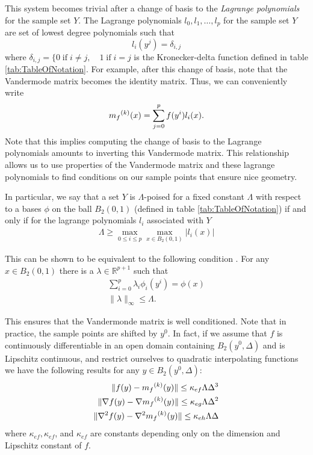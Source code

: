 This system becomes trivial after a change of basis to the \emph{Lagrange polynomials} for the sample set $Y$.
The Lagrange polynomials $l_0, l_1, \ldots, l_p$ for the sample set $Y$ are set of lowest degree polynomials such that
\[
l_i(y^j) = \delta_{i,j}
\]
where $\delta_{i,j} = \{0 \;\text{if}\; i\ne j,\quad 1 \;\text{if} \; i = j $ is the Kronecker-delta function defined in table \ref{tab:TableOfNotation}.
For example, after this change of basis, note that the Vandermode matrix becomes the identity matrix.
Thus, we can conveniently write
\[
\label{reg}
{{m}_f}^{(k)}(x) = \sum^p_{j=0}f(y^i)l_i(x).
\]
Note that this implies computing the change of basis to the Lagrange polynomials amounts to inverting this Vandermode matrix.
This relationship allows us to use properties of the Vandermode matrix and these lagrange polynomials to find conditions on our sample points that ensure nice geometry.

In particular, we say that a set $Y$ is $\Lambda$-poised for a fixed constant $\Lambda$ with respect to a bases $\phi$ on the ball 
$B_2(0, 1)$ (defined in table \ref{tab:TableOfNotation}) if and only if for the lagrange polynomials $l_i$ associated with $Y$
\begin{align}
\Lambda \ge \max_{0\le i\le p}\max_{x\in B_2(0, 1)}|l_i(x)|
\end{align}

This can be shown to be equivalent to the following condition \cite{DUMMY:intro_book}.
For any $x \in B_2(0, 1)$ there is a $\lambda \in \mathbb R ^ {p+1}$ such that 
\begin{align}
\sum_{i=0}^p\lambda_i\phi_i(y^i) = \phi(x) \\
\|\lambda\|_{\infty} \le \Lambda.
\end{align}

This ensures that the Vandermonde matrix is well conditioned.
Note that in practice, the sample points are shifted by $y^0$.
In fact, if we assume that $f$ is continuously differentiable in an open domain containing $B_2(y^0, \Delta)$ and is Lipschitz continuous, and restrict ourselves to quadratic interpolating functions we have the following results for any $y \in B_2(y^0, \Delta)$:
\begin{align}
 \|f(y) - {{m}_f}^{(k)}(y)\| \le \kappa_{ef} \Lambda \Delta^3 \\
 \|\nabla f(y) - \nabla {{m}_f}^{(k)}(y)\| \le \kappa_{eg} \Lambda \Delta^2 \\
 \|\nabla^2 f(y) - \nabla^2 {{m}_f}^{(k)}(y)\| \le \kappa_{eh}\Lambda \Delta \\
\end{align}
where
$\kappa_{ef}, \kappa_{ef}$, and $\kappa_{ef}$ are constants depending only on the dimension and Lipschitz constant of $f$.

